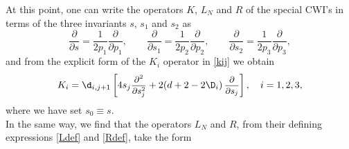 \documentclass[a4paper,11pt,openright,twoside]{book}
\newcommand{\sdfrac}[2]{\mbox{\small$\displaystyle\frac{#1}{#2}$}}
\numberwithin{equation}{section}
\begin{document}
{{At this point, one can write the operators $K$, $L_N$ and $R$ of the special CWI's in terms of the three invariants $s$, $s_1$ and $s_2$ as
\begin{equation}
	\frac{\partial}{\partial s}=\frac{1}{2p_1}\frac{\partial}{\partial p_1},\qquad\frac{\partial}{\partial s_1}=\frac{1}{2p_2}\frac{\partial}{\partial p_2},\qquad \frac{\partial}{\partial s_2}=\frac{1}{2p_3}\frac{\partial}{\partial p_3},
\end{equation}
and from the explicit form of the $K_i$ operator in \eqref{kij} we obtain
\begin{equation}
	K_i=\d_{i,j+1}\left[4s_j\sdfrac{\partial^2}{\partial s_j^2}+2( d+2-2\D_i)\,\sdfrac{\partial}{\partial s_j}\right],\quad i=1,2,3,
\end{equation}
where we have set $s_0\equiv s$.\\
In the same way, we find that the operators $L_N$ and $R$, from their defining expressions \eqref{Ldef} 
and \eqref{Rdef}, take the form

}}
\end{document}
